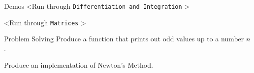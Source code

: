 \documentclass{beamer}
\begin{document}
\begin{frame}{Demos}
    \textless Run through \texttt{Differentiation and Integration} \textgreater \par \pause
    \textless Run through \texttt{Matrices} \textgreater
\end{frame}
\begin{frame}{Problem Solving}
    Produce a function that prints out odd values up to a number $n$. \par \pause
    Produce an implementation of Newton's Method.
\end{frame}
\end{document}
